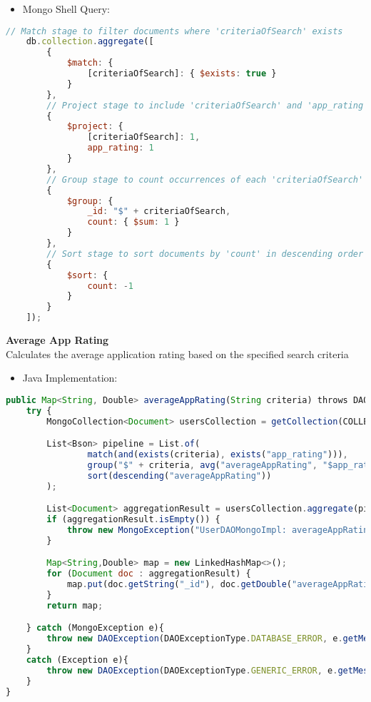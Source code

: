 \begin{itemize}
    \item Mongo Shell Query:
\end{itemize}
\begin{lstlisting}[language=JavaScript]
    // Match stage to filter documents where 'criteriaOfSearch' exists
    db.collection.aggregate([
        {
            $match: {
                [criteriaOfSearch]: { $exists: true }
            }
        },
        // Project stage to include 'criteriaOfSearch' and 'app_rating' fields
        {
            $project: {
                [criteriaOfSearch]: 1,
                app_rating: 1
            }
        },
        // Group stage to count occurrences of each 'criteriaOfSearch'
        {
            $group: {
                _id: "$" + criteriaOfSearch,
                count: { $sum: 1 }
            }
        },
        // Sort stage to sort documents by 'count' in descending order
        {
            $sort: {
                count: -1
            }
        }
    ]);     


\end{lstlisting} 
\textbf{Average App Rating}\\
Calculates the average application rating based on the specified search criteria
\begin{itemize}
    \item Java Implementation:
\end{itemize}
\begin{lstlisting}[language=JavaScript]
    public Map<String, Double> averageAppRating(String criteria) throws DAOException {
    try {
        MongoCollection<Document> usersCollection = getCollection(COLLECTION_NAME);

        List<Bson> pipeline = List.of(
                match(and(exists(criteria), exists("app_rating"))),
                group("$" + criteria, avg("averageAppRating", "$app_rating")),
                sort(descending("averageAppRating"))
        );

        List<Document> aggregationResult = usersCollection.aggregate(pipeline).into(new ArrayList<>());
        if (aggregationResult.isEmpty()) {
            throw new MongoException("UserDAOMongoImpl: averageAppRating: No data found");
        }

        Map<String,Double> map = new LinkedHashMap<>();
        for (Document doc : aggregationResult) {
            map.put(doc.getString("_id"), doc.getDouble("averageAppRating"));
        }
        return map;

    } catch (MongoException e){
        throw new DAOException(DAOExceptionType.DATABASE_ERROR, e.getMessage());
    }
    catch (Exception e){
        throw new DAOException(DAOExceptionType.GENERIC_ERROR, e.getMessage());
    }
}
\end{lstlisting}
        
